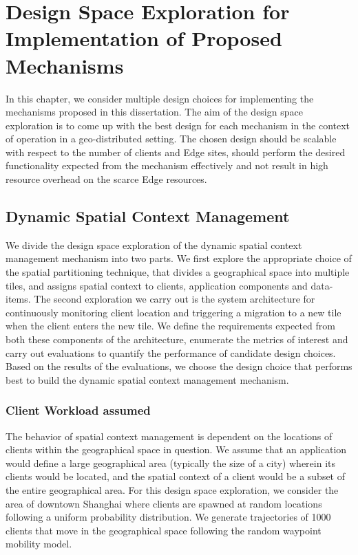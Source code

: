 \chapter{Design Space Exploration for Implementation of Proposed Mechanisms}
\label{sec:design_space_exploration}

In this chapter, we consider multiple design choices for implementing the mechanisms proposed in this dissertation. The aim of the design space exploration is to come up with the best design for each mechanism in the context of operation in a geo-distributed setting. The chosen design should be scalable with respect to the number of clients and Edge sites, should perform the desired functionality expected from the mechanism effectively and not result in high resource overhead on the scarce Edge resources.

\section{Dynamic Spatial Context Management}
\label{sec:spatial_ctx_dse}
We divide the design space exploration of the dynamic spatial context management mechanism into two parts. We first explore the appropriate choice of the spatial partitioning technique, that divides a geographical space into multiple tiles, and assigns spatial context to clients, application components and data-items. The second exploration we carry out is the system architecture for continuously monitoring client location and triggering a migration to a new tile when the client enters the new tile. We define the requirements expected from both these components of the architecture, enumerate the metrics of interest and carry out evaluations to quantify the performance of candidate design choices. Based on the results of the evaluations, we choose the design choice that performs best to build the dynamic spatial context management mechanism.

\subsection{Client Workload assumed}
The behavior of spatial context management is dependent on the locations of clients within the geographical space in question. We assume that an application would define a large geographical area (typically the size of a city) wherein its clients would be located, and the spatial context of a client would be a subset of the entire geographical area. For this design space exploration, we consider the area of downtown Shanghai where clients are spawned at random locations following a uniform probability distribution. We generate trajectories of 1000 clients that move in the geographical space following the random waypoint mobility model. 

